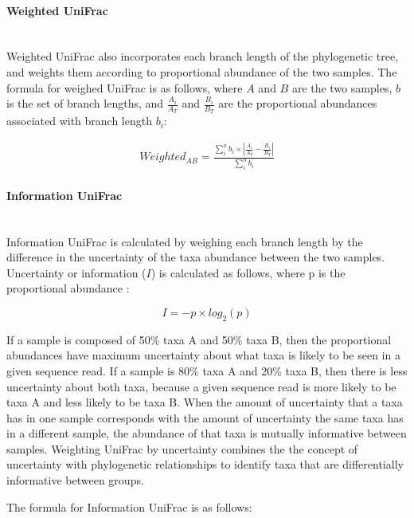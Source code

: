 \documentclass[10pt,letterpaper]{article}
\begin{document}
\paragraph{Weighted UniFrac}\mbox{}\\
Weighted UniFrac \cite{lozupone2007quantitative} also incorporates each branch length of the phylogenetic tree, and weights them according to proportional abundance of the two samples. The formula for weighed UniFrac is as follows, where $A$ and $B$ are the two samples, $b$ is the set of branch lengths, and $\frac{A_{i}}{A_{T}}$ and $\frac{B_{i}}{B_{T}}$ are the proportional abundances associated with branch length $b_{i}$:

\begin{align*}
Weighted_{AB} = \frac{\sum_{i}^{n} b_{i} \times \left| \frac{A_{i}}{A_{T}} - \frac{B_{i}}{B_{T}} \right|}{\sum_{i}^{n} b_{i}}
\end{align*}

\paragraph{Information UniFrac}\mbox{}\\
Information UniFrac is calculated by weighing each branch length by the difference in the uncertainty of the taxa abundance between the two samples. Uncertainty or information ($I$) is calculated as follows, where p is the proportional abundance \cite{shannon2001mathematical}:

\begin{equation}\label{eq:schemeP} 
I = - p  \times log_{2}(p)
\end{equation}

If a sample is composed of 50\% taxa A and 50\% taxa B, then the proportional abundances have maximum uncertainty about what taxa is likely to be seen in a given sequence read. If a sample is 80\% taxa A and 20\% taxa B, then there is less uncertainty about both taxa, because a given sequence read is more likely to be taxa A and less likely to be taxa B. When the amount of uncertainty that a taxa has in one sample corresponds with the amount of uncertainty the same taxa has in a different sample, the abundance of that taxa is mutually informative between samples. Weighting UniFrac by uncertainty combines the the concept of uncertainty with phylogenetic relationships to identify taxa that are differentially informative between groups.

The formula for Information UniFrac is as follows:
\end{document}
